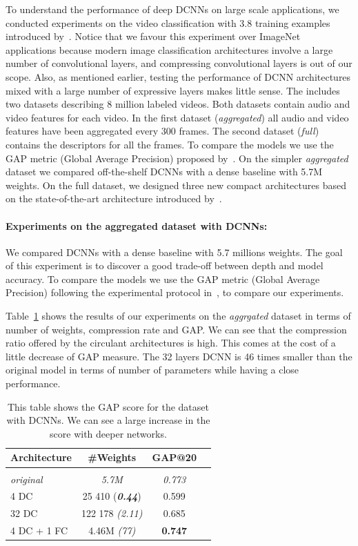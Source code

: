 To understand the performance of deep DCNNs on large scale applications, we conducted experiments on the \yt video classification with 3.8 training examples introduced by~\citet{abu2016youtube}.
Notice that we favour this experiment over ImageNet applications because modern image classification architectures involve a large number of convolutional layers, and compressing convolutional layers is out of our scope. 
Also, as mentioned earlier, testing the performance of DCNN architectures mixed with a large number of expressive layers makes little sense.
The \yt includes two datasets describing 8 million labeled videos.
Both datasets contain audio and video features for each video.
In the first dataset (\emph{aggregated}) all audio and video features have been aggregated every 300 frames.
The second dataset (\emph{full}) contains the descriptors for all the frames.
To compare the models we use the GAP metric (Global Average Precision) proposed by~\citet{abu2016youtube}.
On the simpler \emph{aggregated} dataset we compared off-the-shelf DCNNs with a dense baseline with 5.7M weights.
On the full dataset, we designed three new compact architectures based on the state-of-the-art architecture introduced by~\citet{abu2016youtube}. 

\paragraph{Experiments on the aggregated dataset with DCNNs:}
We compared DCNNs with a dense baseline with 5.7 millions weights.
The goal of this experiment is to discover a good trade-off between depth and model accuracy.
To compare the models we use the GAP metric (Global Average Precision) following the experimental protocol in~\cite{abu2016youtube}, to compare our experiments. 

Table~\ref{table:youtube_agg_xp} shows the results of our experiments on the {\em aggrgated} \yt dataset in terms of number of weights, compression rate and GAP.
We can see that the compression ratio offered by the circulant architectures is high.
This comes at the cost of a little decrease of GAP measure.
The 32 layers DCNN is 46 times smaller than the original model in terms of number of parameters while having a close performance. 


\begin{table}
  \centering
  \caption{This table shows the GAP score for the \yt dataset with DCNNs. We can see a large increase in the score with deeper networks.}
  \begin{tabular}{lccc}
    \toprule
    \textbf{Architecture} & \textbf{\#Weights} &
    \textbf{GAP@20} \\
    \hline \\
    \textit{original} & \textit{5.7M} & \textit{0.773} \\
    4 DC & 25 410  (\textit{\textbf{0.44}}) & 0.599   \\
    32 DC  & 122 178 \textit{(2.11)} & 0.685   \\
    4 DC + 1 FC & 4.46M \textit{(77)} & \textbf{0.747} \\
  \hline
  \end{tabular}
  \label{table:youtube_agg_xp}
\end{table}

